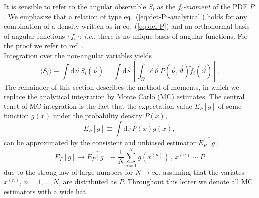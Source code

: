 \documentclass[aps,prd,reprint,nofootinbib,preprintnumbers]{revtex4}
\newcommand{\dual}[1]{\tilde{#1}}
\newcommand{\est}[1]{\widehat{#1}}
\newcommand{\ie}{\textit{i.e.}}
\newcommand{\nuvec}{\vec{\nu}}
\newcommand{\refeq}[1]{eq.~(\ref{eq:#1})}
\newcommand{\rmdx}[1]{\mbox{d} #1 \,} %
\newcommand{\thvec}{\vec{\vartheta}}
\renewcommand{\theta}{\vartheta}
\begin{document}
It is sensible to refer to the angular observable $S_i$ as the
\emph{$f_i$-moment} of the PDF $P$.  We emphasize that a relation of
type \refeq{det-Pi-analytical} holds for any combination of a density
written as in \refeq{def-P} and an orthonormal basis of angular
functions $\lbrace f_i \rbrace$; \ie, there is no unique
basis of angular functions. For the proof we refer to ref. \cite{Dighe:1998vk}.\\

Integration over the non-angular variables yields
\begin{equation}
    \langle S_i\rangle
    \equiv \int \rmdx{\vec\nu} S_i(\nuvec)
    = \int \rmdx{\vec \nu} \left[\int_{\Omega} \rmdx{\vec \theta} P(\nuvec,\thvec) \dual{f}_i(\thvec) \right].
\end{equation}
The remainder of this section describes the method of moments, in
which we replace the analytical integration by Monte Carlo (MC)
estimates.  The central tenet of MC integration is the fact that the
expectation value $E_P[g]$ of some function $g(x)$ under the
probability density $P(x)$,
\begin{equation}
    E_P[g] \equiv \int \rmdx{x} P(x) g(x),
\end{equation}
can be approximated by the consistent and unbiased
estimator $\est{E_P[g]}$~\cite[sec. 8.2]{James:2006zz}
\begin{equation}
    \label{eq:mc-id}
    E_P[g] \to \widehat{E_P[g]} \equiv \frac{1}{N} \sum_{n=1}^N g(x^{(n)}) \,,\,    x^{(n)} \sim P
\end{equation}
due to the strong law of large numbers for $N \to \infty$, assuming
that the variates $x^{(n)}$, $n = 1, \dots, N$, are distributed as
$P$.
Throughout this letter we denote all MC estimators with a wide hat.\\
\end{document}
